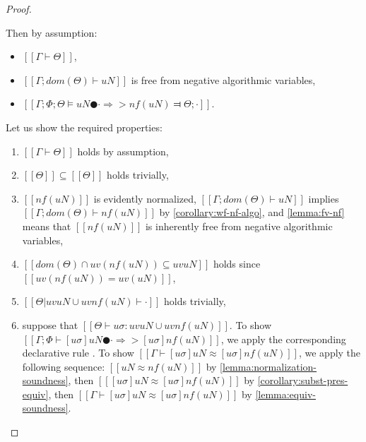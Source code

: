 \begin{proof}
\begin{caseof}
        \item {}
            Then by assumption:
            \begin{itemize}
                \item $[[Γ ⊢ Θ]]$,
                \item $[[Γ; dom(Θ) ⊢  uN]]$ is free from negative algorithmic variables,
                \item $[[Γ; Φ; Θ ⊨ uN ● · ⇒> nf(uN) ⫤ Θ; ·]]$.
            \end{itemize}

            Let us show the required properties: 
            \begin{enumerate}
                \item $[[Γ ⊢ Θ]]$ holds by assumption,
                \item $[[Θ]] \subseteq [[Θ]]$ holds trivially,
                \item $[[nf(uN)]]$ is evidently normalized, 
                    $[[Γ; dom(Θ) ⊢  uN]]$ implies $[[Γ; dom(Θ) ⊢  nf(uN)]]$ by 
                    \cref{corollary:wf-nf-algo},
                    and \cref{lemma:fv-nf} means that $[[nf(uN)]]$ is 
                    inherently free from negative algorithmic variables,
                \item $[[dom(Θ) ∩ uv(nf(uN)) ⊆ uv uN]]$
                    holds since $[[uv(nf(uN)) = uv(uN)]]$,
                \item $[[Θ|uv uN ∪ uv nf(uN) ⊢ ·]]$ holds trivially,
                \item suppose that $[[ Θ ⊢ uσ : uv uN ∪ uv nf(uN) ]]$.
                    To show $[[ Γ ; Φ ⊢ [uσ]uN ● · ⇒> [uσ]nf(uN) ]]$, we apply the corresponding 
                    declarative rule .
                    To show $[[ Γ ⊢ [uσ]uN ≈ [uσ]nf(uN) ]]$,
                    we apply the following sequence:
                    $[[uN ≈ nf(uN)]]$ by 
                    \cref{lemma:normalization-soundness},
                    then $[[ [uσ]uN ≈ [uσ]nf(uN) ]]$
                    by \cref{corollary:subst-pres-equiv},
                    then $[[ Γ ⊢ [uσ]uN ≈ [uσ]nf(uN) ]]$
                    by \cref{lemma:equiv-soundness}. 
            \end{enumerate}


\end{caseof}
\end{proof}
